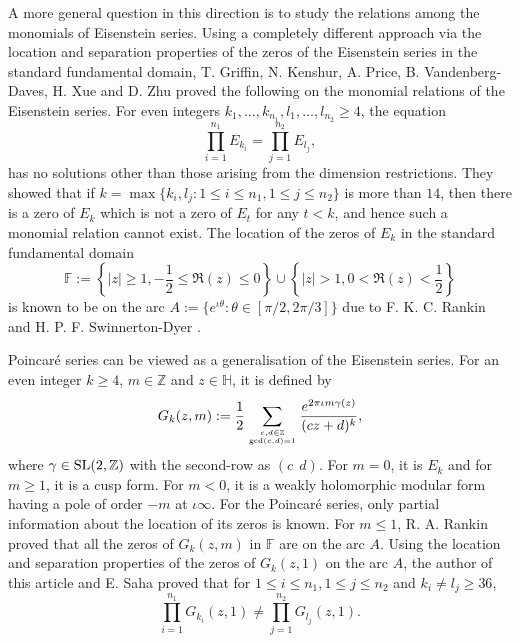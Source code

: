 \documentclass[12pt,reqno]{amsart}
\newcommand{\F}{{\mathbb F}}
\newcommand{\Z}{{\mathbb Z}}
\newcommand{\uH}{{\mathbb H}}
\begin{document}
A more general question in this direction is to study the relations among the monomials of Eisenstein series. Using a completely different approach via the location and separation properties of the zeros of the Eisenstein series in the standard fundamental domain, T. Griffin, N. Kenshur, A. Price, B. Vandenberg-Daves, H. Xue and D. Zhu \cite{GKP} proved the following on the monomial relations of the Eisenstein series.
For even integers $k_1,\ldots,k_{n_1},l_1,\ldots,l_{n_2}\ge4$, the equation
 $$
 \prod_{i=1}^{n_1} E_{k_i}=\prod_{j=1}^{n_2} E_{l_j},
 $$
 has no solutions other than those arising from the dimension restrictions.
They showed that if $k=\max\{k_i,l_j: 1\le i\le n_1, 1\le j \le n_2\}$ is more than $14$, then there is a zero of $E_k$ which is not a zero of $E_t$ for any $t<k$, and hence such a monomial relation cannot exist. The location of the zeros of $E_k$ in the standard fundamental domain
$$
\F:= \left\{ |z| \ge 1, -\frac{1}{2} \le \Re(z) \le 0 \right\}
\cup \left\{ |z| > 1, 0 < \Re(z) < \frac{1}{2} \right\}
$$ 
is known to be on the arc $A:=\{e^{\iota\theta}:\theta\in[\pi/2,2\pi/3]\}$ due to F. K. C. Rankin and H. P. F. Swinnerton-Dyer \cite{RSD}.

Poincar\'e series can be viewed as a generalisation of the Eisenstein series. For an even integer $k\ge 4$, $m\in \Z$ and $z\in \uH$, it is defined by
$$
G_k(z,m):=\frac{1}{2}\sum_{c,d\in\Z \atop \gcd(c,d)=1} \frac{e^{2\pi \iota m\gamma(z)}}{(cz+d)^k},
$$
where $\gamma\in{\rm SL}(2,\Z)$ with the second-row as $(c\ \ d)$. For $m=0$, it is $E_k$ and for $m\ge1$, it is a cusp 
form. For $m<0$, it is a weakly holomorphic modular form having a pole of order $-m$ at $\iota\infty$. 
For the Poincaré series, only partial information about the location of its zeros is known. For $m\le 1$, R. A. Rankin 
\cite{RR} proved that all the zeros of $G_k(z,m)$ in $\F$ are on the arc $A$. Using the location and separation
 properties of the zeros of $G_{k}(z,1)$ on the arc $A$, the author of this article and E. Saha \cite{KS2} proved that for $1\le i\le n_1, 1\le j\le n_2$ and $k_i\ne l_j \ge 36$,
 $$
\prod_{i=1}^{n_1}G_{k_i}(z,1)\neq\prod_{j=1}^{n_2}G_{l_j}(z,1).
 $$
 
\end{document}
